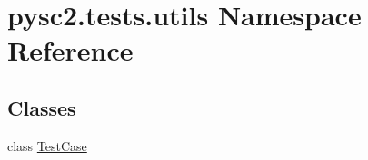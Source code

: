 \hypertarget{namespacepysc2_1_1tests_1_1utils}{}\section{pysc2.\+tests.\+utils Namespace Reference}
\label{namespacepysc2_1_1tests_1_1utils}
\subsection*{Classes}
\begin{DoxyCompactItemize}
\item 
class \mbox{\hyperlink{classpysc2_1_1tests_1_1utils_1_1_test_case}{Test\+Case}}
\end{DoxyCompactItemize}
